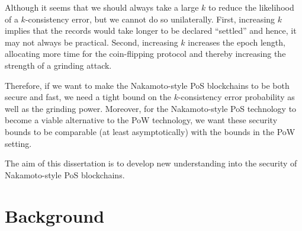 Although it seems that we should always take a large $k$ to 
reduce the likelihood of a $k$-consistency error, but 
we cannot do so unilaterally. 
First, increasing $k$ implies that the records 
would take longer to be declared ``settled'' 
and hence, it may not always be practical.
Second, increasing $k$ 
increases the epoch length, 
allocating more time for the coin-flipping protocol and 
thereby increasing the strength of a grinding attack. 

Therefore, 
if we want to make the Nakamoto-style PoS blockchains to be 
both secure and fast, 
we need a tight bound on the $k$-consistency error probability
as well as the grinding power. 
Moreover, 
for the Nakamoto-style PoS technology  
to become a viable alternative to the PoW technology, 
we want these security bounds to be comparable (at least asymptotically) 
with the bounds in the PoW setting.




The aim of this dissertation 
is to develop new understanding 
into the security of Nakamoto-style PoS blockchains.






\section{Background}\label{sec:background-intro}

